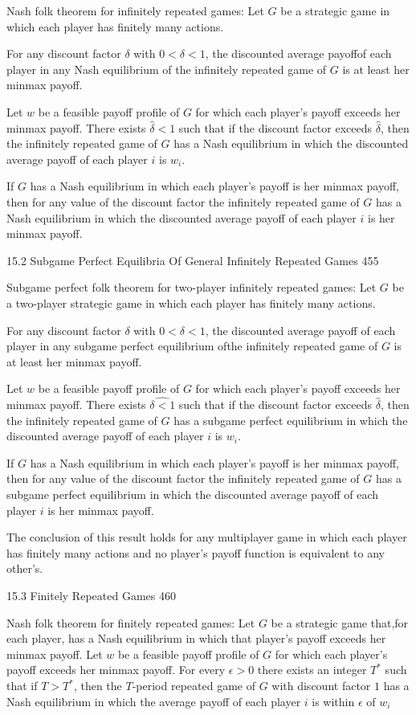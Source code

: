 Nash folk theorem for infinitely repeated games: Let $G$ be a strategic game in which each player has finitely many actions.

For any discount factor $\delta$ with $0<\delta<1$, the discounted average payoffof each player in any Nash equilibrium of the infinitely repeated game of $G$ is at least her minmax payoff.

Let $w$ be a feasible payoff profile of $G$ for which each player's payoff exceeds her minmax payoff. There exists $\hat{\delta}<1$ such that if the discount factor exceeds $\hat{\delta}$, then the infinitely repeated game of $G$ has a Nash equilibrium in which the discounted average payoff of each player $i$ is $w_i$.

If $G$ has a Nash equilibrium in which each player's payoff is her minmax payoff, then for any value of the discount factor the infinitely repeated game of $G$ has a Nash equilibrium in which the discounted average payoff of each player $i$ is her minmax payoff.

15.2 Subgame Perfect Equilibria Of General Infinitely Repeated Games 455

Subgame perfect folk theorem for two-player infinitely repeated games: Let $G$ be a two-player strategic game in which each player has finitely many actions.

For any discount factor $\delta$ with $0<\delta<1$, the discounted average payoff of each player in any subgame perfect equilibrium ofthe infinitely repeated game of $G$ is at least her minmax payoff.

Let $w$ be a feasible payoff profile of $G$ for which each player's payoff exceeds her minmax payoff. There exists $\hat{\delta<1}$ such that if the discount factor exceeds $\hat{\delta}$, then the infinitely repeated game of $G$ has a subgame perfect equilibrium in which the discounted average payoff of each player $i$ is $w_i$.

If $G$ has a Nash equilibrium in which each player's payoff is her minmax payoff, then for any value of the discount factor the infinitely repeated game of $G$ has a subgame perfect equilibrium in which the discounted average payoff of each player $i$ is her minmax payoff.

The conclusion of this result holds for any multiplayer game in which each player has finitely many actions and no player's payoff function is equivalent to any other's.

15.3 Finitely Repeated Games 460

Nash folk theorem for finitely repeated games: Let $G$ be a strategic game that,for each player, has a Nash equilibrium in which that player's payoff exceeds her minmax payoff. Let $w$ be a feasible payoff profile of $G$ for which each player's payoff exceeds her minmax payoff. For every $\epsilon>0$ there exists an integer $T^*$ such that if $T>T^*$, then the $T$-period repeated game of $G$ with discount factor $1$ has a Nash equilibrium in which the average payoff of each player $i$ is within $\epsilon$ of $w_i$

